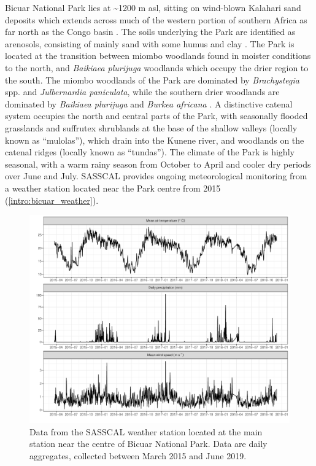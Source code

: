 \begin{refsection}
Bicuar National Park lies at \textasciitilde{}1200 m asl, sitting on wind-blown Kalahari sand deposits which extends across much of the western portion of southern Africa as far north as the Congo basin \citep{Shaw2002}. The soils underlying the Park are identified as arenosols, consisting of mainly sand with some humus and clay \citep{Jones2013, Hartemink2008}. The Park is located at the transition between miombo woodlands found in moister conditions to the north, and \textit{Baikiaea plurijuga} woodlands which occupy the drier region to the south. The miombo woodlands of the Park are dominated by \textit{Brachystegia} spp. and \textit{Julbernardia paniculata}, while the southern drier woodlands are dominated by \textit{Baikiaea plurijuga} and \textit{Burkea africana} \citep{Teixeira1968}. A distinctive catenal system occupies the north and central parts of the Park, with seasonally flooded grasslands and suffrutex shrublands at the base of the shallow valleys (locally known as ``mulolas''), which drain into the Kunene river, and woodlands on the catenal ridges (locally known as ``tundas''). The climate of the Park is highly seasonal, with a warm rainy season from October to April and cooler dry periods over June and July. SASSCAL provides ongoing meteorological monitoring from a weather station located near the Park centre from 2015 (\autoref{intro:bicuar_weather}).

\begin{figure}
	\includegraphics[width=\linewidth]{img/bicuar_weather}
	\caption[Bicuar National Park climate time series]{Data from the SASSCAL weather station located at the main station near the centre of Bicuar National Park. Data are daily aggregates, collected between March 2015 and June 2019.} 
	\label{intro:bicuar_weather}
\end{figure}


\end{refsection}
